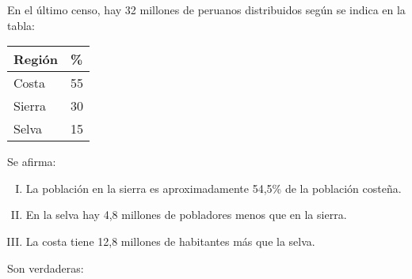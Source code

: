 En el último censo, hay 32 millones de peruanos distribuidos según se indica en la tabla:
\begin{center}
\begin{tabular}{|l|l|}
\hline
Región & \% \\
\hline
Costa & 55 \\
\hline
Sierra & 30 \\
\hline
Selva & 15 \\
\hline
\end{tabular}
\end{center}
Se afirma:
\begin{enumerate} [I.]
\item La población en la sierra es aproximadamente 54,5\% de la población costeña.
\item En la selva hay 4,8 millones de pobladores menos que en la sierra.
\item La costa tiene 12,8 millones de habitantes más que la selva.
\end{enumerate}
Son verdaderas:
